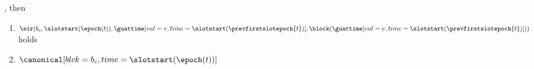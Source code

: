 \documentclass{article}
\begin{document}
\begin{lemma}
\begin{enumerate}
    \end{enumerate},
    then
    \begin{enumerate}
        \item $\sir(b_c,\slotstart(\epoch(t)),\guattime[val=v,time={\slotstart(\prevfirstslotepoch{t})}],\block(\guattime[val=v,time={\slotstart(\prevfirstslotepoch{t})}]))$ holds
        \item $\canonical[blck={b_c},time=\slotstart(\epoch(t))]$
    \end{enumerate}
\end{lemma}
\end{document}
